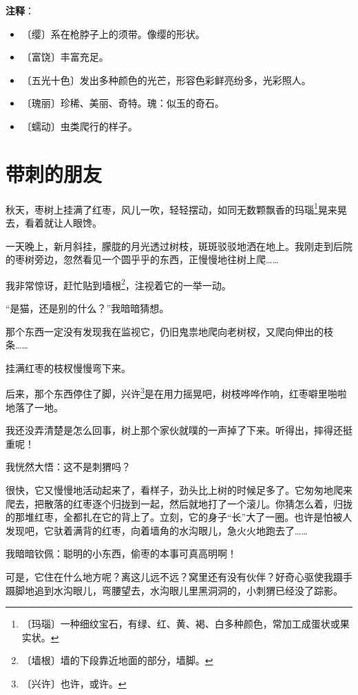 \documentclass[12pt,UTF-8,openany]{ctexbook}
\begin{document}
\newpage

\textbf{注释}：

\vspace{-1em}

\begin{itemize}
    \setlength\itemsep{-0.2em}
    \item 〔缨〕系在枪脖子上的须带。像缨的形状。
    \item 〔富饶〕丰富充足。
    \item 〔五光十色〕发出多种颜色的光芒，形容色彩鲜亮纷多，光彩照人。
    \item 〔瑰丽〕珍稀、美丽、奇特。瑰：似玉的奇石。
    \item 〔蠕动〕虫类爬行的样子。
\end{itemize}

\chapter{带刺的朋友}

\begin{large}
    
    秋天，枣树上挂满了红枣，风儿一吹，轻轻摆动，如同无数颗飘香的玛瑙\footnote{〔玛瑙〕一种细纹宝石，有绿、红、黄、褐、白多种颜色，常加工成蛋状或果实状。}晃来晃去，看着就让人眼馋。
    
    一天晚上，新月斜挂，朦胧的月光透过树枝，斑斑驳驳地洒在地上。我刚走到后院的枣树旁边，忽然看见一个圆乎乎的东西，正慢慢地往树上爬……
    
    我非常惊讶，赶忙贴到墙根\footnote{〔墙根〕墙的下段靠近地面的部分，墙脚。}，注视着它的一举一动。
    
    “是猫，还是别的什么？”我暗暗猜想。
    
    那个东西一定没有发现我在监视它，仍旧鬼祟地爬向老树杈，又爬向伸出的枝条……
    
    挂满红枣的枝杈慢慢弯下来。
    
    后来，那个东西停住了脚，兴许\footnote{〔兴许〕也许，或许。}是在用力摇晃吧，树枝哗哗作响，红枣噼里啪啦地落了一地。
    
    我还没弄清楚是怎么回事，树上那个家伙就噗的一声掉了下来。听得出，摔得还挺重呢！
    
    我恍然大悟：这不是刺猬吗？
    
    很快，它又慢慢地活动起来了，看样子，劲头比上树的时候足多了。它匆匆地爬来爬去，把散落的红枣逐个归拢到一起，然后就地打了一个滚儿。你猜怎么着，归拢的那堆红枣，全都扎在它的背上了。立刻，它的身子“长”大了一圈。也许是怕被人发现吧，它驮着满背的红枣，向着墙角的水沟眼儿，急火火地跑去了……
    
    我暗暗钦佩：聪明的小东西，偷枣的本事可真高明啊！
    
    可是，它住在什么地方呢？离这儿远不远？窝里还有没有伙伴？好奇心驱使我蹑手蹑脚地追到水沟眼儿，弯腰望去，水沟眼儿里黑洞洞的，小刺猬已经没了踪影。
    
\end{large}
\end{document}
